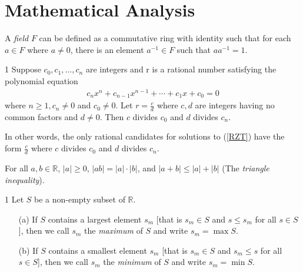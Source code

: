 \chapter{Mathematical Analysis}
\thispagestyle{fancy}

\begin{defn}{1}
	A \textit{field} $F$ can be defined as a commutative ring with identity such that for each $a\in F$ where $a \neq 0$, there is an element $a^{-1} \in F$ such that $a a^{-1}=1$.
\end{defn}

\begin{theo}{1}
	Suppose $c_0, c_1, \dots,c_n$ are integers and r is a rational number satisfying the polynomial equation
	\begin{align}
		c_nx^n+c_{n-1}x^{n-1}+\cdots + c_1x+c_0=0 \label{RZT}
	\end{align}
	where $n\geq 1, c_n \neq 0$ and $c_0 \neq 0$. Let $r=\frac{c}{d}$ where $c,d$ are integers having no common factors and $d \neq 0$. Then $c$ divides $c_0$ and $d$ divides $c_n$.
	
	\hspace{1cm} In other words, the only rational candidates for solutions to (\ref{RZT}) have the form $\frac{c}{d}$ where $c$ divides $c_0$ and $d$ divides $c_n$.
\end{theo}

\begin{theo}{1}
	For all $a,b \in \mathbb{R}$, $|a| \geq 0$, $|ab| = |a|\cdot|b|$, and $|a+b| \leq |a|+|b|$ (The \textit{triangle inequality}).
\end{theo}

\begin{defn}{1}
	Let $S$ be a non-empty subset of $\mathbb{R}$.
	\begin{enumerate}
		\item[(a)] If $S$ contains a largest element $s_m$ [that is $s_m \in S$ and $s \leq s_m$ for all $s \in S$], then we call $s_m$ the \textit{maximum} of $S$ and write $s_m = \max S$.
		
		\item[(b)] If $S$ contains a smallest element $s_m$ [that is $s_m \in S$ and $s_m \leq s$ for all $s \in S$], then we call $s_m$ the \textit{minimum} of $S$ and write $s_m = \min S$.
	\end{enumerate}
\end{defn}

